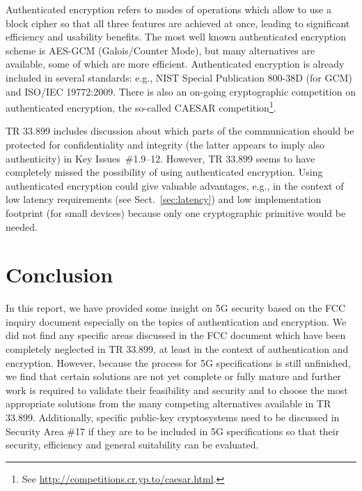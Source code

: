 \documentclass[12pt]{llncs}
\begin{document}
Authenticated encryption refers to modes of operations which allow to use a block cipher so that all three features are achieved at once, leading to significant efficiency and usability benefits. The most well known authenticated encryption scheme is AES-GCM (Galois/Counter Mode), but many alternatives are available, some of which are more efficient. Authenticated encryption is already included in several standards: e.g., NIST Special Publication 800-38D (for GCM) and ISO/IEC 19772:2009. There is also an on-going cryptographic competition on authenticated encryption, the so-called CAESAR competition\footnote{See \url{http://competitions.cr.yp.to/caesar.html}.}. 

TR 33.899 includes discussion about which parts of the communication should be protected for confidentiality and integrity (the latter appears to imply also authenticity) in Key Issues~\#1.9--12. However, TR 33.899 seems to have completely missed the possibility of using authenticated encryption. Using authenticated encryption could give valuable advantages, e.g., in the context of low latency requirements (see Sect.~\ref{sec:latency}) and low implementation footprint (for small devices) because only one cryptographic primitive would be needed.


\section{Conclusion}
\label{sec:conclusion}

In this report, we have provided some insight on 5G security based on the FCC inquiry document especially on the topics of authentication and encryption. %
We did not find any specific areas discussed in the FCC document which have been completely neglected in TR 33.899, at least in the context of authentication and encryption. However, because the process for 5G specifications is still unfinished, we find that certain solutions are not yet complete or fully mature and further work is required to validate their feasibility and security and to choose the most appropriate solutions from the many competing alternatives available in TR 33.899. Additionally, specific public-key cryptosystems need to be discussed in Security Area \#17 if they are to be included in 5G specifications so that their security, efficiency and general suitability can be evaluated. 








\end{document}
